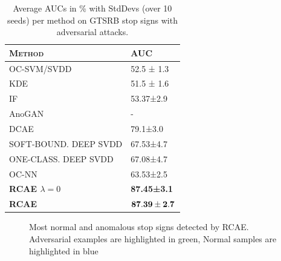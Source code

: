\begin{table}[ht]
\caption{Average AUCs in \% with StdDevs (over 10 seeds) per
method on GTSRB stop signs with adversarial attacks.} %
\centering %
\begin{tabular}{l l } %
\hline\hline %
\bf{\textsc{Method}} & \bf{\textsc{AUC}}\\ [0.5ex] %
\hline %
OC-SVM/SVDD & 52.5 ± 1.3 \\ %
KDE & 51.5 ± 1.6 \\
IF & 53.37±2.9 \\
AnoGAN & - \\
DCAE & 79.1±3.0 \\
SOFT-BOUND. DEEP SVDD & 67.53±4.7 \\
ONE-CLASS. DEEP SVDD & 67.08±4.7 \\
OC-NN & 63.53±2.5 \\
\bf{\bf{RCAE $\lambda =0$}} &\bf{87.45±3.1} \\
\bf{RCAE} & {$\bf{87.39 \pm 2.7}$} \\ [1ex] %
\hline %
\end{tabular}
\label{tab:gtsrbresults}
\end{table}



\begin{figure}
\hspace{0.5cm}
\caption{Most normal and anomalous stop signs detected by RCAE. Adversarial examples are highlighted in green, Normal samples are highlighted in blue}
\label{fig:gtsrbrcaeresults}
\end{figure}


